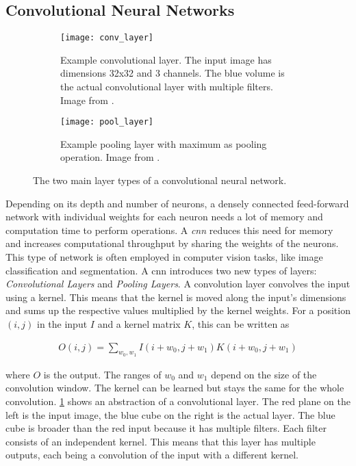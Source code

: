 \subsection{Convolutional Neural Networks}

\begin{figure}[!tbp]
	\centering
	\begin{subfigure}[t]{0.45\textwidth}
		\centering
    	\texttt{[image: conv\_layer]}
    	\caption{Example convolutional layer. The input image has dimensions 32x32 and 3 channels. The blue volume is the actual convolutional layer with multiple filters. Image from \cite{convolutional_layer_image}.}
    	\label{fig:conv_layer}
	\end{subfigure}
	\hfill
	\begin{subfigure}[t]{0.5\textwidth}
		\centering
    	\texttt{[image: pool\_layer]}
    	\caption{Example pooling layer with maximum as pooling operation. Image from \cite{pooling_layer_image}.}
    	\label{fig:pool_layer}
	\end{subfigure}
	\caption{The two main layer types of a convolutional neural network.}
\end{figure} 

Depending on its depth and number of neurons, a densely connected feed-forward network with individual weights for each neuron needs a lot of memory and computation time to perform operations. A \textit{\acf{cnn}} reduces this need for memory and increases computational throughput by sharing the weights of the neurons. This type of network is often employed in computer vision tasks, like image classification and segmentation. A \ac{cnn} introduces two new types of layers: \textit{Convolutional Layers} and \textit{Pooling Layers}. A convolution layer convolves the input using a kernel. This means that the kernel is moved along the input's dimensions and sums up the respective values multiplied by the kernel weights. For a position $(i, j)$ in the input $I$ and a kernel matrix $K$, this can be written as

\begin{align}
O(i, j) = \sum\limits_{w_0, w_1} I(i + w_0, j + w_1)K(i + w_0, j + w_1) \label{eqn:convolutional_layer}
\end{align} 

where $O$ is the output. The ranges of $w_0$ and $w_1$ depend on the size of the convolution window.
The kernel can be learned but stays the same for the whole convolution. \fig \ref{fig:conv_layer} shows an abstraction of a convolutional layer. The red plane on the left is the input image, the blue cube on the right is the actual layer. The blue cube is broader than the red input because it has multiple filters. Each filter consists of an independent kernel. This means that this layer has multiple outputs, each being a convolution of the input with a different kernel.

